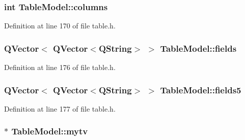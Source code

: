\hypertarget{classTableModel_a363abf84b86025d76dd5f29c1e255bdd}{
\subsubsection[{columns}]{\setlength{\rightskip}{0pt plus 5cm}int {\bf TableModel::columns}}}
\label{classTableModel_a363abf84b86025d76dd5f29c1e255bdd}


Definition at line 170 of file table.h.

\hypertarget{classTableModel_aa7a971b1dc03dbf0392bb0c77c5a5e85}{
\subsubsection[{fields}]{\setlength{\rightskip}{0pt plus 5cm}QVector$<$ QVector$<$QString$>$ $>$ {\bf TableModel::fields}}}
\label{classTableModel_aa7a971b1dc03dbf0392bb0c77c5a5e85}


Definition at line 176 of file table.h.

\hypertarget{classTableModel_aaba457443a11f6e5e720ffb65b6f7191}{
\subsubsection[{fields5}]{\setlength{\rightskip}{0pt plus 5cm}QVector$<$ QVector$<$QString$>$ $>$ {\bf TableModel::fields5}}}
\label{classTableModel_aaba457443a11f6e5e720ffb65b6f7191}


Definition at line 177 of file table.h.

\hypertarget{classTableModel_a8971dba45716f1d616d51f9363935ace}{
\subsubsection[{mytv}]{$\ast$ {\bf TableModel::mytv}}}
\label{classTableModel_a8971dba45716f1d616d51f9363935ace}


